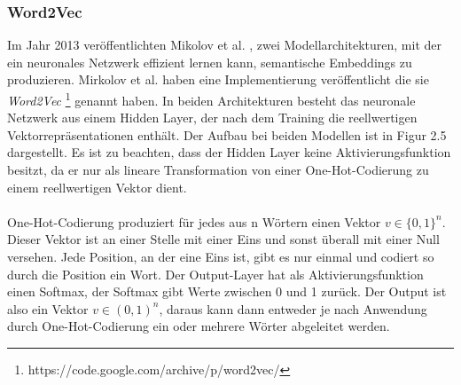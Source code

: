 \documentclass[12pt,letterpaper,ngerman]{article}
\begin{document}
\subsubsection{Word2Vec}
Im Jahr 2013 veröffentlichten Mikolov et al.  
\cite{word2vec},
zwei Modellarchitekturen, mit der ein
neuronales Netzwerk effizient lernen kann, semantische Embeddings
zu produzieren.
Mirkolov et al. haben eine Implementierung veröffentlicht die sie 
\textit{Word2Vec} \footnote{https://code.google.com/archive/p/word2vec/}
genannt haben.
In beiden Architekturen besteht das neuronale Netzwerk aus einem 
Hidden Layer, der nach dem Training die reellwertigen 
Vektorrepräsentationen enthält.
Der Aufbau bei beiden Modellen ist in Figur 2.5 dargestellt.
Es ist zu beachten, dass der Hidden Layer keine Aktivierungsfunktion 
besitzt, da er nur als lineare Transformation von einer 
One-Hot-Codierung zu einem reellwertigen Vektor dient.
\hfill\\
\pagebreak\\
One-Hot-Codierung produziert für jedes aus n Wörtern einen Vektor
$v \in \{0,1\}^n$. Dieser Vektor ist an einer Stelle mit einer Eins
und sonst überall mit einer Null versehen. Jede Position, an der eine
Eins ist, gibt es nur einmal und codiert so durch die Position ein Wort.
Der Output-Layer hat als Aktivierungsfunktion einen Softmax, der 
Softmax gibt Werte zwischen 0 und 1 zurück. Der Output ist also ein 
Vektor $v \in (0,1)^n$, daraus kann dann entweder je nach Anwendung 
durch One-Hot-Codierung ein oder mehrere Wörter abgeleitet werden.\\
\end{document}
